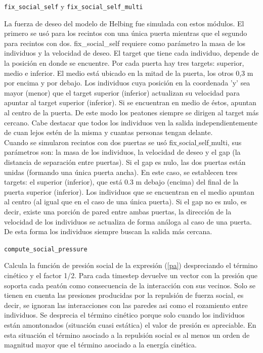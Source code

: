 {\Large {\tt fix\_social\_self} y {\tt fix\_social\_self\_multi}}

La fuerza de deseo del modelo de Helbing fue simulada con estos módulos. El primero se usó para los recintos con una única puerta mientras que el segundo para recintos con dos. 
fix\_social\_self requiere como parámetro la masa de los individuos y la velocidad de deseo. El target que tiene cada individuo, depende de la posición en donde se encuentre. Por cada puerta hay tres targets: superior, medio e inferior. El medio está ubicado en la mitad de la puerta, los otros 0,3 m por encima y por debajo.  Los individuos cuya posición en la coordenada 'y' sea mayor (menor) que el target superior (inferior) actualizan su velocidad para apuntar al target superior (inferior). Si se encuentran en medio de éstos, apuntan al centro de la puerta. De este modo los peatones siempre se dirigen al target más cercano. Cabe destacar que todos los individuos ven la salida independientemente de cuan lejos estén de la misma y cuantas personas tengan delante.\\  

Cuando se simularon recintos con dos puertas se usó fix$\_$social$\_$self$\_$multi, sus parámetros son: la masa de los individuos, la velocidad de deseo y el gap (la distancia de separación entre puertas). Si el gap es nulo, las dos puertas están unidas (formando una única puerta ancha). En este caso, se establecen tres targets: el superior (inferior), que está 0.3 m debajo (encima) del final de la puerta superior (inferior). Los individuos que se encuentran en el medio apuntan al centro (al igual que en el caso de una única puerta).
Si el gap no es nulo, es decir, existe una porción de pared entre ambas puertas, la dirección de la velocidad de los individuos se actualiza de forma análoga al caso de una puerta. De esta forma los individuos siempre buscan la salida más cercana. 

{\Large {\tt compute\_social\_pressure}}

Calcula la función de presión social de la expresión (\eqref{pa}) despreciando el término cinético y el factor 1/2. Para cada timestep devuelve un vector con la presión que soporta cada peatón como consecuencia de la interacción con sus vecinos. Solo se tienen en cuenta las presiones producidas por la repulsión de fuerza social, es decir, se ignoran las interacciones con las paredes asi como el rozamiento entre individuos. Se desprecia el término cinético porque solo cuando los individuos están amontonados (situación cuasi estática) el valor de presión es apreciable. En esta situación el término asociado a la repulsión social es al menos un orden de magnitud mayor que el término asociado a la energía cinética.  

